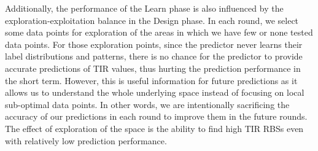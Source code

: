 \documentclass{article}
\begin{document}
Additionally, the
performance of the Learn phase
is also influenced by the exploration-exploitation balance in the Design phase.
In each round, we select some data points for exploration of the areas in which we have few or none tested data points.
For those exploration points, since the predictor never learns their label distributions and patterns, there is no chance for the predictor to provide accurate predictions of TIR values,
thus hurting the prediction performance in the short term.
However, this is useful information for future predictions as it allows us to understand the whole underlying space instead of focusing on local sub-optimal data points.
In other words, we are intentionally sacrificing the accuracy of our predictions in each round to improve them in the future rounds.
The effect of exploration of the space is the ability to find high TIR RBSs even with relatively low prediction performance.\\
\end{document}
